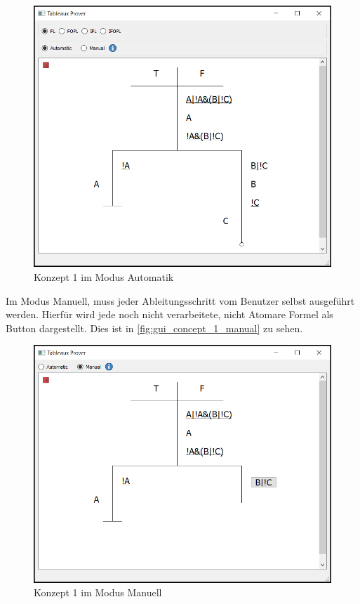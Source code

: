 \begin{figure}[H]
\begin{center}
\includegraphics[scale=0.7]{images/gui_concept_1_automatic.png}
\caption{Konzept 1 im Modus Automatik}
\label{fig:gui_concept_1_automatic}
\end{center}
\end{figure}

Im Modus Manuell, muss jeder Ableitungsschritt vom Benutzer selbst ausgeführt werden. Hierfür wird jede noch nicht verarbeitete, nicht Atomare Formel als Button dargestellt. Dies ist in \autoref{fig:gui_concept_1_manual} zu sehen.

\begin{figure}[H]
\begin{center}
\includegraphics[scale=0.7]{images/gui_concept_1_manual.png}
\caption{Konzept 1 im Modus Manuell}
\label{fig:gui_concept_1_manual}
\end{center}
\end{figure}

